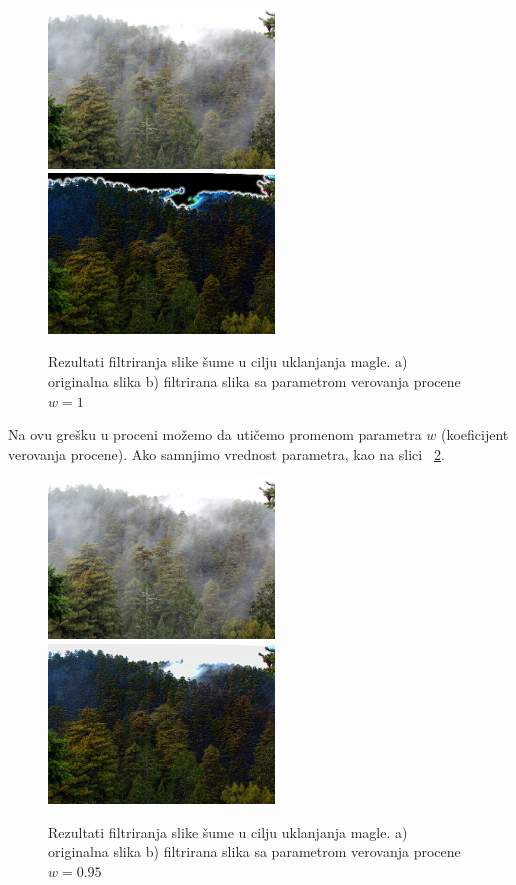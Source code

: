 \documentclass[a4paper,12pt,titlepage]{article}
\begin{document}
\begin{figure}[ht!]
\centering
\includegraphics[width=60mm]{img/forest.png}
\includegraphics[width=60mm]{img/forest100.png}
\caption{Rezultati filtriranja slike šume u cilju uklanjanja magle. a) originalna slika b) filtrirana slika sa parametrom verovanja procene $w = 1$}
\label{Šuma1}
\end{figure} 

Na ovu grešku u proceni možemo da utičemo promenom parametra $w$ (koeficijent verovanja procene). Ako samnjimo vrednost parametra, kao na slici ~\ref{Šuma2}.

\begin{figure}[ht!]
\centering
\includegraphics[width=60mm]{img/forest.png}
\includegraphics[width=60mm]{img/forest95.png}
\caption{Rezultati filtriranja slike šume u cilju uklanjanja magle. a) originalna slika b) filtrirana slika sa parametrom verovanja procene $w = 0.95$}
\label{Šuma2}
\end{figure} 
\end{document}

